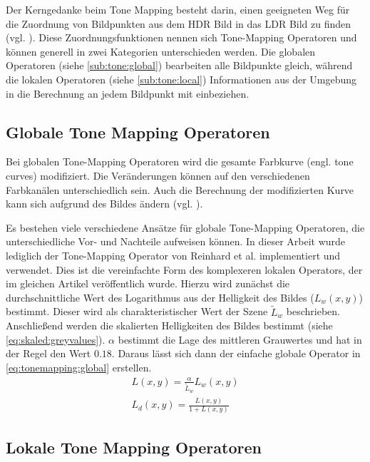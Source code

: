  Der Kerngedanke beim Tone Mapping besteht darin, einen geeigneten Weg für die Zuordnung von Bildpunkten aus dem \gls{HDR} Bild in das \gls{LDR} Bild zu finden (vgl. \cite[S. 145]{Bloch2012}). Diese Zuordnungsfunktionen nennen sich \gls{Tone-Mapping} Operatoren und können generell in zwei Kategorien unterschieden werden. Die globalen Operatoren (siehe \autoref{sub:tone:global}) bearbeiten alle Bildpunkte gleich, während die lokalen Operatoren (siehe \autoref{sub:tone:local}) Informationen aus der Umgebung in die Berechnung an jedem Bildpunkt mit einbeziehen.
 

 \subsection{Globale Tone Mapping Operatoren}
\label{sub:tone:global}
Bei globalen \gls{Tone-Mapping} Operatoren wird die gesamte Farbkurve (engl. tone curves) modifiziert. Die Veränderungen können auf den verschiedenen Farbkanälen unterschiedlich sein. Auch die Berechnung der modifizierten Kurve kann sich aufgrund des Bildes ändern (vgl. \cite[S. 146]{Bloch2012}). 

Es bestehen viele verschiedene Ansätze für globale \gls{Tone-Mapping} Operatoren, die unterschiedliche Vor- und Nachteile aufweisen können.
In dieser Arbeit wurde lediglich der \gls{Tone-Mapping} Operator von Reinhard et al. \cite{ReinhardToneMapper} implementiert und verwendet. Dies ist die vereinfachte Form des komplexeren lokalen Operators, der im gleichen Artikel veröffentlich wurde.
Hierzu wird zunächst die durchschnittliche Wert des Logarithmus aus der Helligkeit des Bildes ($L_w(x,y)$) bestimmt. Dieser wird als charakteristischer Wert der Szene $\tilde{L}_w$ beschrieben. Anschließend werden die skalierten Helligkeiten des Bildes bestimmt (siehe \autoref{eq:skaled:greyvalues}). $\alpha$ bestimmt die Lage des mittleren Grauwertes und hat in der Regel den Wert $0.18$. Daraus lässt sich dann der einfache globale Operator in \autoref{eq:tonemapping:global} erstellen.
\begin{align}
\label{eq:skaled:greyvalues}
L(x,y) = \frac{\alpha}{\tilde{L}_w} L_w(x,y)\\
\label{eq:tonemapping:global}
L_d(x, y) =\frac{L(x,y)}{1+ L(x,y)}
\end{align}


\subsection{Lokale Tone Mapping Operatoren}
\label{sub:tone:local}

